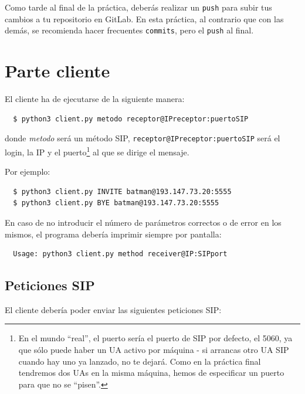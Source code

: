 \documentclass[a4paper,11pt]{article}
\begin{document}
Como tarde al final de la práctica, deberás realizar un \texttt{push} para subir tus cambios a tu repositorio en GitLab. En esta práctica, al contrario que con las demás, se recomienda hacer frecuentes \texttt{commits}, pero el \texttt{push} al final.


\section*{Parte cliente}

El cliente ha de ejecutarse de la siguiente manera:
\begin{verbatim}
  $ python3 client.py metodo receptor@IPreceptor:puertoSIP
\end{verbatim}

donde \emph{metodo} será un método SIP, \texttt{receptor@IPreceptor:puertoSIP}
será el login, la IP y el puerto\footnote{En el mundo ``real'', el puerto sería 
el puerto de SIP por defecto, el 5060, ya que sólo puede haber un UA activo
por máquina - si arrancas otro UA SIP cuando hay uno ya lanzado, no te dejará.
Como en la práctica final tendremos dos UAs en la
misma máquina, hemos de especificar un puerto para que no se ``pisen''.}
al que se dirige el mensaje.

Por ejemplo:
\begin{verbatim}
  $ python3 client.py INVITE batman@193.147.73.20:5555
  $ python3 client.py BYE batman@193.147.73.20:5555
\end{verbatim}

En caso de no introducir el número de parámetros correctos o de error en los mismos, el programa debería imprimir siempre por pantalla:

\begin{verbatim}
  Usage: python3 client.py method receiver@IP:SIPport
\end{verbatim}

\subsection*{Peticiones SIP}

El cliente debería poder enviar las siguientes peticiones SIP:
\end{document}
